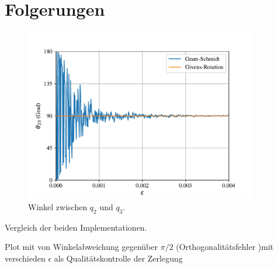 %
%
%
\section{Folgerungen
\label{qr:section:folgerungen}}
\begin{figure}[ht]
\centering
\includegraphics[width=0.9\textwidth]{papers/qr/pics/comp.pdf}
\caption{Winkel zwischen $q_2$ und $q_3$.\label{qr:comp}}
\end{figure}


Vergleich der beiden Implementationen.

Plot mit von Winkelabweichung gegenüber $\pi/2$ (\glqq Orthogonalitätsfehler \grqq{})mit verschieden $\epsilon$ als Qualitätskontrolle der Zerlegung

